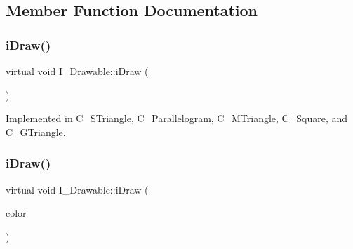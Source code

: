 \subsection{Member Function Documentation}
\mbox{\label{classI__Drawable_ae24c65000977a805f52ce032321cd86f}} 
\subsubsection{\texorpdfstring{i\+Draw()}{iDraw()}\hspace{0.1cm}{\footnotesize\ttfamily [1/2]}}
{\footnotesize\ttfamily virtual void I\+\_\+\+Drawable\+::i\+Draw (\begin{DoxyParamCaption}{ }\end{DoxyParamCaption})\hspace{0.3cm}{\ttfamily [pure virtual]}}



Implemented in \hyperlink{classC__STriangle_a7297480fe52b58654d81e2e70fbb237d}{C\+\_\+\+S\+Triangle}, \hyperlink{classC__Parallelogram_a6d43cc787a39def68c7b7de4a33caf5e}{C\+\_\+\+Parallelogram}, \hyperlink{classC__MTriangle_ae75dd212f0b580664affc740945c8d0b}{C\+\_\+\+M\+Triangle}, \hyperlink{classC__Square_ae6c51a7720576bcbb94b52584552df28}{C\+\_\+\+Square}, and \hyperlink{classC__GTriangle_a53abbd8cd622323fc2f3b80ce91cfde9}{C\+\_\+\+G\+Triangle}.

\mbox{\label{classI__Drawable_a25f6474325614c451a91f019e5fe8010}} 
\subsubsection{\texorpdfstring{i\+Draw()}{iDraw()}\hspace{0.1cm}{\footnotesize\ttfamily [2/2]}}
{\footnotesize\ttfamily virtual void I\+\_\+\+Drawable\+::i\+Draw (\begin{DoxyParamCaption}\item[{M\+L\+V\+\_\+\+Color}]{color }\end{DoxyParamCaption})\hspace{0.3cm}{\ttfamily [pure virtual]}}



